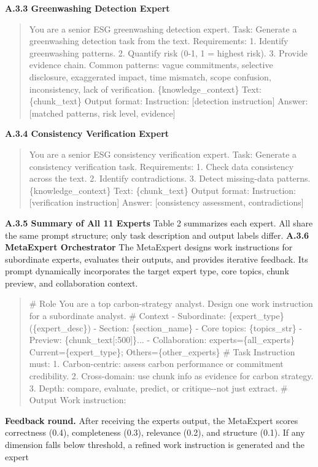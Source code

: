 \documentclass[9pt,twocolumn]{extarticle}
\begin{document}
\textbf{A.3.3 Greenwashing Detection Expert}
\begin{quote}
You are a senior ESG greenwashing detection expert.
Task: Generate a greenwashing detection task from the text.
Requirements:
1. Identify greenwashing patterns.
2. Quantify risk (0-1, 1 = highest risk).
3. Provide evidence chain.
Common patterns: vague commitments, selective disclosure,
exaggerated impact, time mismatch, scope confusion,
inconsistency, lack of verification.
\{knowledge\_context\}
Text:
\{chunk\_text\}
Output format:
Instruction: [detection instruction]
Answer: [matched patterns, risk level, evidence]
\end{quote}
\textbf{A.3.4 Consistency Verification Expert}
\begin{quote}
You are a senior ESG consistency verification expert.
Task: Generate a consistency verification task.
Requirements:
1. Check data consistency across the text.
2. Identify contradictions.
3. Detect missing-data patterns.
\{knowledge\_context\}
Text:
\{chunk\_text\}
Output format:
Instruction: [verification instruction]
Answer: [consistency assessment, contradictions]
\end{quote}
\textbf{A.3.5 Summary of All 11 Experts}
Table 2 summarizes each expert. All share the same prompt structure;
only task description and output labels differ.
\textbf{A.3.6 MetaExpert Orchestrator}
The MetaExpert designs work instructions for subordinate experts,
evaluates their outputs, and provides iterative feedback. Its prompt
dynamically incorporates the target expert type, core topics, chunk
preview, and collaboration context.
\begin{quote}
\# Role
You are a top carbon-strategy analyst.
Design one work instruction for a subordinate analyst.
\# Context
- Subordinate: \{expert\_type\} (\{expert\_desc\})
- Section: \{section\_name\}
- Core topics: \{topics\_str\}
- Preview: \{chunk\_text[:500]\}...
- Collaboration: experts=\{all\_experts\}
Current=\{expert\_type\}; Others=\{other\_experts\}
\# Task
Instruction must:
1. Carbon-centric: assess carbon performance or commitment credibility.
2. Cross-domain: use chunk info as evidence for carbon strategy.
3. Depth: compare, evaluate, predict, or critique-\/-not just extract.
\# Output
Work instruction:
\end{quote}
\textbf{Feedback round.} After receiving the expert\textquotesingle s
output, the MetaExpert scores correctness (0.4), completeness (0.3),
relevance (0.2), and structure (0.1). If any dimension falls below
threshold, a refined work instruction is generated and the expert
\end{document}
